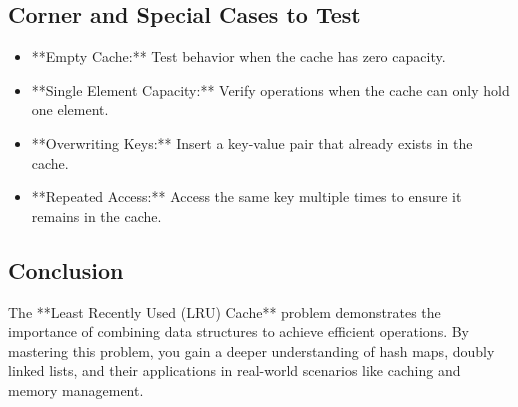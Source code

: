 \subsection*{Corner and Special Cases to Test}
\begin{itemize}
    \item **Empty Cache:** Test behavior when the cache has zero capacity.
    \item **Single Element Capacity:** Verify operations when the cache can only hold one element.
    \item **Overwriting Keys:** Insert a key-value pair that already exists in the cache.
    \item **Repeated Access:** Access the same key multiple times to ensure it remains in the cache.
\end{itemize}

\subsection*{Conclusion}
The **Least Recently Used (LRU) Cache** problem demonstrates the importance of combining data structures to achieve efficient operations. By mastering this problem, you gain a deeper understanding of hash maps, doubly linked lists, and their applications in real-world scenarios like caching and memory management.